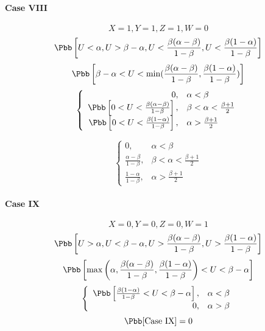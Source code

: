 \paragraph{Case VIII}
\[X = 1, Y = 1, Z = 1, W = 0\]
\[\Pbb\left[U < \alpha, U > \beta-\alpha, U < \frac{\beta(\alpha-\beta)}{1-\beta}, U < \frac{\beta(1-\alpha)}{1-\beta}\right]\]
\[\Pbb\left[\beta-\alpha < U < \min(\frac{\beta(\alpha-\beta)}{1-\beta},\frac{\beta(1-\alpha)}{1-\beta})\right]\]
\begin{displaymath}
\left\{\begin{array}{rl}
0, & \alpha < \beta\\
\Pbb\left[0 < U < \frac{\beta(\alpha-\beta)}{1-\beta}\right], & \beta < \alpha < \frac{\beta+1}{2}\\
\Pbb\left[0 < U < \frac{\beta(1-\alpha)}{1-\beta}\right], & \alpha > \frac{\beta+1}{2}\\
\end{array}\right.
\end{displaymath}

\begin{displaymath}
\left\{\begin{array}{rl}
0, & \alpha < \beta\\
\frac{\alpha-\beta}{1-\beta}, & \beta < \alpha < \frac{\beta + 1}{2}\\
\frac{1-\alpha}{1-\beta}, & \alpha > \frac{\beta + 1}{2}
\end{array}\right.
\end{displaymath}

\paragraph{Case IX}
\[X = 0, Y = 0, Z = 0, W = 1\]
\[\Pbb\left[U > \alpha, U < \beta-\alpha, U > \frac{\beta(\alpha-\beta)}{1-\beta}, U > \frac{\beta(1-\alpha)}{1-\beta}\right]\]
\[\Pbb\left[\max\left(\alpha, \frac{\beta(\alpha-\beta)}{1-\beta}, \frac{\beta(1-\alpha)}{1-\beta}\right) < U < \beta-\alpha\right]\]
\begin{displaymath}
\left\{\begin{array}{rl}
\Pbb\left[\frac{\beta(1-\alpha)}{1-\beta} < U < \beta-\alpha\right], & \alpha < \beta\\
0, & \alpha > \beta
\end{array}\right.
\end{displaymath}
\[\Pbb[\mbox{Case IX}] = 0\]


